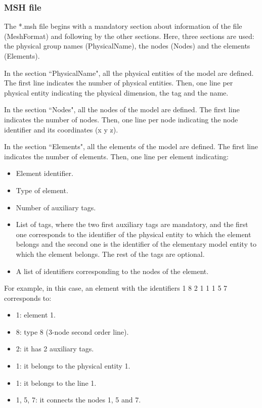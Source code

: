 \documentclass[a4]{article}
\begin{document}
\subsubsection{MSH file}

The *.msh file begins with a mandatory section about information of the file (MeshFormat) and following by the other sections. Here, three sections are used: the physical group names (PhysicalName), the nodes (Nodes) and the elements (Elements).

In the section ``PhysicalName", all the physical entities of the model are defined. The first line indicates the number of physical entities. Then, one line per physical entity indicating the physical dimension, the tag and the name.  

In the section ``Nodes", all the nodes of the model are defined. The first line indicates the number of nodes. Then, one line per node indicating the node identifier and its coordinates (x y z).

In the section ``Elements", all the elements of the model are defined. The first line indicates the number of elements. Then, one line per element indicating:

\begin{itemize}
	\item Element identifier.
	\item Type of element.
	\item Number of auxiliary tags.
	\item List of tags, where the two first auxiliary tags are mandatory, and the first one corresponds to the identifier of the physical entity to which the element belongs and the second one is the identifier of the elementary model entity to which the element belongs. The rest of the tags are optional.
	\item A list of identifiers corresponding to the nodes of the element.
\end{itemize}

For example, in this case, an element with the identifiers 1 8 2 1 1 1 5 7 corresponds to:

\begin{itemize}
	\item 1: element 1.
	\item 8: type 8 (3-node second order line).
	\item 2: it has 2 auxiliary tags.
	\item 1: it belongs to the physical entity 1.
	\item 1: it belongs to the line 1.
	\item 1, 5, 7: it connects the nodes 1, 5 and 7.
\end{itemize} 
\end{document}
